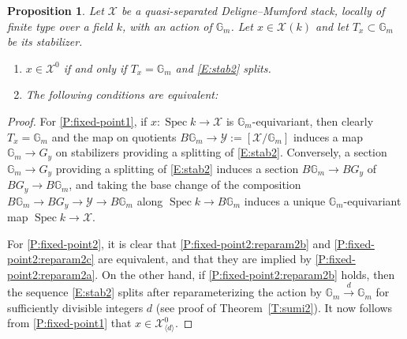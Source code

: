 \documentclass[a4paper]{amsart}
\theoremstyle{plain}
\newtheorem{proposition}[theorem]{Proposition}
\theoremstyle{definition}
\theoremstyle{remark}
\numberwithin{equation}{section}
\newcommand{\GG}{\mathbb{G}}
\newcommand\cX{\mathcal{X}}
\newcommand\cY{\mathcal{Y}}
\newcommand\co{\colon}
\DeclareMathOperator{\Spec}{Spec}
\newcommand{\itemref}[1]{\eqref{#1}}
\begin{document}
\begin{proposition} \label{P:fixed-point}
Let $\cX$ be a quasi-separated Deligne--Mumford stack, 
locally of finite type over a field $k$, with an action of $\GG_m$.
Let $x\in \cX(k)$ and let $T_x \subset \GG_m$ be its stabilizer.
\begin{enumerate}
	\item \label{P:fixed-point1}
		$x \in \cX^0$ if and only if $T_x = \GG_m$ and \eqref{E:stab2} splits.
	\item \label{P:fixed-point2}
		The following conditions are equivalent:
\end{enumerate}
\end{proposition}
\begin{proof}
For \eqref{P:fixed-point1}, if $x \co \Spec k \to \cX$ is $\GG_m$-equivariant, then clearly $T_x = \GG_m$ and the map on quotients $B\GG_m \to \cY := [\cX/\GG_m]$ induces a map $\GG_m \to G_y$ on stabilizers providing a splitting of \eqref{E:stab2}.  Conversely, a section $\GG_m \to G_y$ providing a splitting of \eqref{E:stab2} induces a section $B \GG_m \to BG_y$ of $BG_y \to B \GG_m$, and taking the base change of the composition $B \GG_m \to BG_y \to \cY \to B\GG_m$ along $\Spec k \to B \GG_m$ induces a unique $\GG_m$-equivariant map $\Spec k \to \cX$.

For \eqref{P:fixed-point2}, it is clear that \itemref{P:fixed-point2:reparam2b} and \itemref{P:fixed-point2:reparam2c} are equivalent, and that they are implied by \itemref{P:fixed-point2:reparam2a}.  On the other hand, if \itemref{P:fixed-point2:reparam2b} holds, then the sequence \eqref{E:stab2} splits after reparameterizing the action by $\GG_m \xrightarrow{d} \GG_m$ for sufficiently divisible integers $d$ (see proof of Theorem~\ref{T:sumi2}). It now follows from \eqref{P:fixed-point1} that $x \in \cX^0_{\langle d \rangle}$.
\end{proof}
\end{document}
